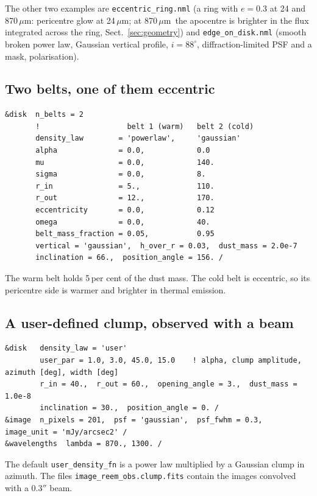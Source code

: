 \documentclass[11pt,a4paper]{article}
\newcommand{\code}[1]{\texttt{#1}}
\newcommand{\um}{\,$\mu$m}
\begin{document}
The other two examples are \code{eccentric\_ring.nml} (a ring with $e=0.3$ at 24 and 870\um:
pericentre glow at 24\um; at 870\um\ the apocentre is brighter in the flux integrated across the
ring, Sect.~\ref{sec:geometry}) and
\code{edge\_on\_disk.nml} (smooth broken power law, Gaussian vertical profile, $i=88^\circ$,
diffraction-limited PSF and a mask, polarisation).

\subsection{Two belts, one of them eccentric}

\begin{lstlisting}[style=nml]
&disk  n_belts = 2
       !                    belt 1 (warm)   belt 2 (cold)
       density_law        = 'powerlaw',     'gaussian'
       alpha              = 0.0,            0.0
       mu                 = 0.0,            140.
       sigma              = 0.0,            8.
       r_in               = 5.,             110.
       r_out              = 12.,            170.
       eccentricity       = 0.0,            0.12
       omega              = 0.0,            40.
       belt_mass_fraction = 0.05,           0.95
       vertical = 'gaussian',  h_over_r = 0.03,  dust_mass = 2.0e-7
       inclination = 66.,  position_angle = 156. /
\end{lstlisting}
The warm belt holds 5\,per cent of the dust mass. The cold belt is eccentric, so its pericentre
side is warmer and brighter in thermal emission.

\subsection{A user-defined clump, observed with a beam}

\begin{lstlisting}[style=nml]
&disk   density_law = 'user'
        user_par = 1.0, 3.0, 45.0, 15.0    ! alpha, clump amplitude, azimuth [deg], width [deg]
        r_in = 40.,  r_out = 60.,  opening_angle = 3.,  dust_mass = 1.0e-8
        inclination = 30.,  position_angle = 0. /
&image  n_pixels = 201,  psf = 'gaussian',  psf_fwhm = 0.3,  image_unit = 'mJy/arcsec2' /
&wavelengths  lambda = 870., 1300. /
\end{lstlisting}
The default \code{user\_density\_fn} is a power law multiplied by a Gaussian clump in azimuth.
The files \code{image\_reem\_obs.clump.fits} contain the images convolved with a $0.3''$ beam.
\end{document}

